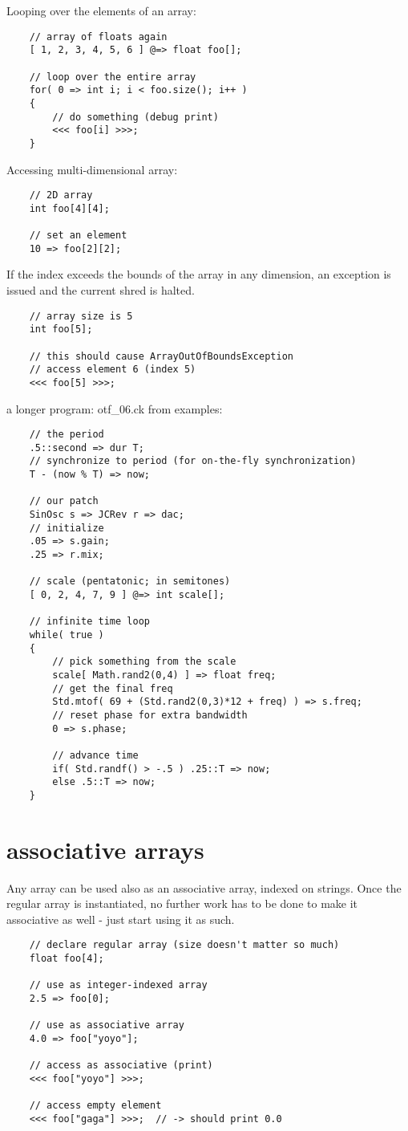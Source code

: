 Looping over the elements of an array:
\begin{verbatim}
    // array of floats again
    [ 1, 2, 3, 4, 5, 6 ] @=> float foo[];

    // loop over the entire array
    for( 0 => int i; i < foo.size(); i++ )
    {
        // do something (debug print)
        <<< foo[i] >>>;
    }
\end{verbatim}

Accessing multi-dimensional array:
\begin{verbatim}
    // 2D array
    int foo[4][4];

    // set an element
    10 => foo[2][2];
\end{verbatim}

If the index exceeds the bounds of the array in any dimension, an exception is issued and the current shred is halted.
\begin{verbatim}
    // array size is 5
    int foo[5];

    // this should cause ArrayOutOfBoundsException
    // access element 6 (index 5)
    <<< foo[5] >>>;
\end{verbatim}

a longer program: otf\_06.ck from examples:
\begin{verbatim}
    // the period
    .5::second => dur T;
    // synchronize to period (for on-the-fly synchronization)
    T - (now % T) => now;

    // our patch
    SinOsc s => JCRev r => dac;
    // initialize
    .05 => s.gain;
    .25 => r.mix;

    // scale (pentatonic; in semitones)
    [ 0, 2, 4, 7, 9 ] @=> int scale[];

    // infinite time loop
    while( true )
    {
        // pick something from the scale
        scale[ Math.rand2(0,4) ] => float freq;
        // get the final freq
        Std.mtof( 69 + (Std.rand2(0,3)*12 + freq) ) => s.freq;
        // reset phase for extra bandwidth
        0 => s.phase;

        // advance time
        if( Std.randf() > -.5 ) .25::T => now;
        else .5::T => now;
    }
\end{verbatim}
 

\section{associative arrays}

Any array can be used also as an associative array, indexed on strings. Once the regular array is instantiated, no further work has to be done to make it associative as well - just start using it as such.
\begin{verbatim}
    // declare regular array (size doesn't matter so much)
    float foo[4];

    // use as integer-indexed array
    2.5 => foo[0];

    // use as associative array
    4.0 => foo["yoyo"];

    // access as associative (print)
    <<< foo["yoyo"] >>>;

    // access empty element
    <<< foo["gaga"] >>>;  // -> should print 0.0
\end{verbatim}


